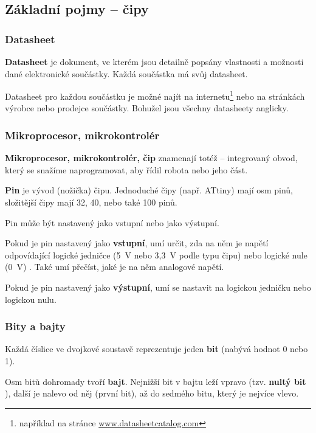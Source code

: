 \subsection{Základní pojmy -- čipy}

\subsubsection{Datasheet}

{\bf Datasheet}  je dokument, ve kterém jsou detailně popsány vlastnosti a možnosti dané elektronické součástky.
 Každá součástka má svůj datasheet. 

Datasheet pro každou součástku je možné najít na internetu\footnote{například na stránce \url{www.datasheetcatalog.com}}
 nebo na stránkách výrobce nebo prodejce součástky. 
 Bohužel jsou všechny datasheety anglicky.  

\subsubsection{Mikroprocesor, mikrokontrolér} 

{\bf Mikroprocesor, mikrokontrolér, čip}   
 znamenají totéž -- integrovaný obvod, který se snažíme naprogramovat, aby řídil robota nebo jeho část. \hypertarget{cip1}{}

{\bf Pin}  je vývod (nožička) čipu. Jednoduché čipy (např. ATtiny) mají osm pinů, složitější čipy mají 32, 40, nebo také 100 pinů.

Pin může být nastavený jako vstupní nebo jako výstupní. 

Pokud je pin nastavený jako {\bf vstupní}, umí určit, zda na něm je napětí odpovídající logické jedničce (5~V nebo 3,3~V podle typu čipu) nebo logické nule (0~V) . 
Také umí přečíst, jaké je na něm analogové napětí. 

Pokud je pin nastavený jako {\bf výstupní},  umí se nastavit na logickou jedničku nebo logickou nulu. 

\subsubsection{Bity a bajty}

Každá číslice ve dvojkové soustavě reprezentuje jeden {\bf bit}  (nabývá hodnot 0 nebo 1). 

Osm bitů dohromady tvoří  {\bf bajt}. 
Nejnižší bit v bajtu leží vpravo (tzv. {\bf nultý bit}   ),  
další je nalevo od něj (první bit), až do sedmého bitu, který je nejvíce vlevo.




